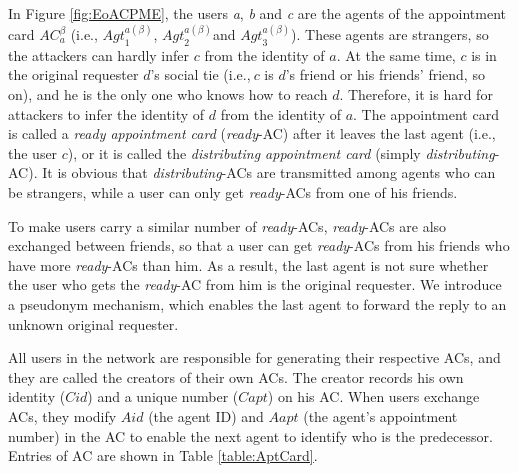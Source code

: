 \documentclass[conference]{IEEEtran}
\begin{document}
In Figure \ref{fig:EoACPME}, the users \textit{a}, \textit{b} and \textit{c} are the agents of the appointment card ${AC}^{\beta }_a$ (i.e., ${Agt}^{a\left(\beta \right)}_1$, ${Agt}^{a\left(\beta \right)}_2$and ${Agt}^{a\left(\beta \right)}_3$). These agents are strangers, so the attackers can hardly infer $c$ from the identity of $a$. At the same time, $c$ is in the original requester $d$'s social tie (i.e.,$\ c$ is $d$'s friend or his friends' friend, so on), and he is the only one who knows how to reach $d$. Therefore, it is hard for attackers to infer the identity of $d$ from the identity of $a$. The appointment card is called a \textit{ready appointment card} (\textit{ready}-AC) after it leaves the last agent (i.e., the user $c$), or it is called the \textit{distributing appointment card} (simply \textit{distributing}-AC). It is obvious that \textit{distributing}-ACs are transmitted among agents who can be strangers, while a user can only get \textit{ready}-ACs from  one of his friends.

To make users carry a similar number of \textit{ready}-ACs, \textit{ready}-ACs are also exchanged between friends, so that a user can get \textit{ready}-ACs from his friends who have more \textit{ready}-ACs than him. As a result, the last agent is not sure whether the user who gets the \textit{ready}-AC from him is the original requester. We introduce a pseudonym mechanism, which enables the last agent to forward the reply to an unknown original requester. 

All users in the network are responsible for generating their respective ACs, and they are called the creators of their own ACs. The creator records his own identity ($Cid$) and a unique number ($Capt$) on his AC. When users exchange ACs, they modify $Aid$ (the agent ID) and ${Aapt}$ (the agent's appointment number) in the AC to enable the next agent to identify who is the predecessor. Entries of AC are shown in Table \ref{table:AptCard}.
\end{document}
